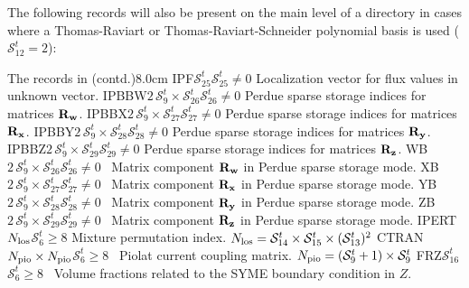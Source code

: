 The following records will also be present on the main level of a 
directory in cases where a Thomas-Raviart or Thomas-Raviart-Schneider polynomial basis is used ($\mathcal{S}^{t}_{12}=2$):

\begin{DescriptionEnregistrement}{The  records in
 (contd.)}{8.0cm}
\OptIntEnr
  {IPF}{$\mathcal{S}^{t}_{25}$}{$\mathcal{S}^{t}_{25}\ne 0$}
  {Localization vector for flux values in unknown vector.} 
\OptIntEnr
  {IPBBW}{$2 \, \mathcal{S}^{t}_{9} \times \mathcal{S}^{t}_{26}$}{$\mathcal{S}^{t}_{26}\ne 0$}
  {Perdue sparse storage indices for matrices $\bf{R}_w$.} 
\OptIntEnr
  {IPBBX}{$2 \, \mathcal{S}^{t}_{9} \times \mathcal{S}^{t}_{27}$}{$\mathcal{S}^{t}_{27}\ne 0$}
  {Perdue sparse storage indices for matrices $\bf{R}_x$.}
\OptIntEnr
  {IPBBY}{$2 \, \mathcal{S}^{t}_{9} \times \mathcal{S}^{t}_{28}$}{$\mathcal{S}^{t}_{28}\ne 0$}
  {Perdue sparse storage indices for matrices $\bf{R}_y$.}
\OptIntEnr
  {IPBBZ}{$2 \, \mathcal{S}^{t}_{9} \times \mathcal{S}^{t}_{29}$}{$\mathcal{S}^{t}_{29}\ne 0$}
  {Perdue sparse storage indices for matrices $\bf{R}_z$.} 
\OptRealEnr
  {WB}{$2 \, \mathcal{S}^{t}_{9} \times \mathcal{S}^{t}_{26}$}{$\mathcal{S}^{t}_{26}\ne 0$}{~}
  {Matrix component $\bf{R}_w$ in Perdue sparse storage mode.} 
\OptRealEnr
  {XB}{$2 \, \mathcal{S}^{t}_{9} \times \mathcal{S}^{t}_{27}$}{$\mathcal{S}^{t}_{27}\ne 0$}{~}
  {Matrix component $\bf{R}_x$ in Perdue sparse storage mode.} 
\OptRealEnr
  {YB}{$2 \, \mathcal{S}^{t}_{9} \times \mathcal{S}^{t}_{28}$}{$\mathcal{S}^{t}_{28}\ne 0$}{~}
  {Matrix component $\bf{R}_y$ in Perdue sparse storage mode.} 
\OptRealEnr
  {ZB}{$2 \, \mathcal{S}^{t}_{9} \times \mathcal{S}^{t}_{29}$}{$\mathcal{S}^{t}_{29}\ne 0$}{~}
  {Matrix component $\bf{R}_z$ in Perdue sparse storage mode.} 
\OptIntEnr
  {IPERT}{$N_{\rm los}$}{$\mathcal{S}^{t}_{6}\ge 8$}
  {Mixture permutation index. $N_{\rm los}=\mathcal{S}^{t}_{14}\times \mathcal{S}^{t}_{15}\times (\mathcal{S}^{t}_{13})^2$} 
\OptDbleEnr
  {CTRAN}{$N_{\rm pio}\times N_{\rm pio}$}{$\mathcal{S}^{t}_{6}\ge 8$}{~}
  {Piolat current coupling matrix. $N_{\rm pio}=(\mathcal{S}^{t}_{9}+1)\times \mathcal{S}^{t}_{9}$} 
\OptRealEnr
  {FRZ}{$\mathcal{S}^{t}_{16}$}{$\mathcal{S}^{t}_{6}\ge 8$}{~}
  {Volume fractions related to the SYME boundary condition in $Z$.} 
\end{DescriptionEnregistrement}

